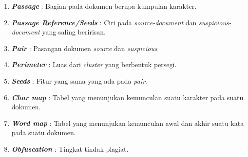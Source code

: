 \documentclass[../Book.tex]{subfiles}
\begin{document}
	\begin{enumerate}
		\item \textbf{\textit{Passage}} : Bagian pada dokumen berupa kumpulan karakter.
		\item \textbf{\textit{Passage Reference/Seeds}} : Ciri pada \textit{source-document} dan \textit{suspicious-document} yang saling beririsan.
		\item \textbf{\textit{Pair}} : Pasangan dokumen \textit{source} dan \textit{suspicious}
		\item \textbf{\textit{Perimeter}} : Luas dari \textit{cluster} yang berbentuk persegi.
		\item \textbf{\textit{Seeds}} : Fitur yang sama yang ada pada \textit{pair}.
		\item \textbf{\textit{Char map}} : Tabel yang menunjukan kemunculan suatu karakter pada suatu dokumen.
		\item \textbf{\textit{Word map}} : Tabel yang menunjukan kemunculan awal dan akhir suatu kata pada suatu dokumen.
		\item \textbf{\textit{Obfuscation}} : Tingkat tindak plagiat.
	\end{enumerate}
	
\end{document}
